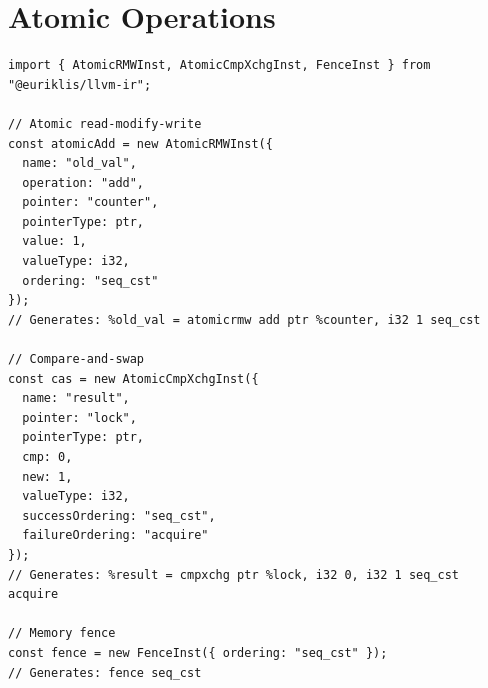 \section{Atomic Operations}

\begin{lstlisting}[style=ts]
import { AtomicRMWInst, AtomicCmpXchgInst, FenceInst } from "@euriklis/llvm-ir";

// Atomic read-modify-write
const atomicAdd = new AtomicRMWInst({
  name: "old_val",
  operation: "add",
  pointer: "counter",
  pointerType: ptr,
  value: 1,
  valueType: i32,
  ordering: "seq_cst"
});
// Generates: %old_val = atomicrmw add ptr %counter, i32 1 seq_cst

// Compare-and-swap
const cas = new AtomicCmpXchgInst({
  name: "result",
  pointer: "lock",
  pointerType: ptr,
  cmp: 0,
  new: 1,
  valueType: i32,
  successOrdering: "seq_cst",
  failureOrdering: "acquire"
});
// Generates: %result = cmpxchg ptr %lock, i32 0, i32 1 seq_cst acquire

// Memory fence
const fence = new FenceInst({ ordering: "seq_cst" });
// Generates: fence seq_cst
\end{lstlisting}

